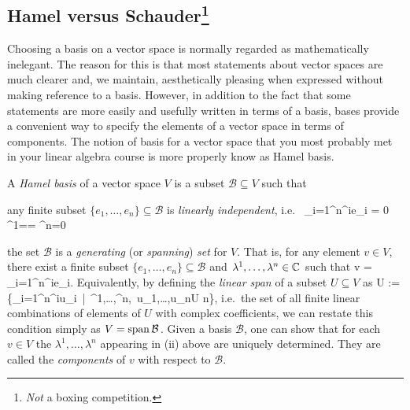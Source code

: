 \subsection[Hamel versus Schauder]{Hamel versus Schauder\protect\footnote{\emph{Not} a boxing competition.  }}

Choosing a basis on a vector space is normally regarded as mathematically inelegant. The reason for this is that most statements about vector spaces are much clearer and, we maintain, aesthetically pleasing when expressed without making reference to a basis. However, in addition to the fact that some statements are more easily and usefully written in terms of a basis, bases provide a convenient way to specify the elements of a vector space in terms of components.
The notion of basis for a vector space that you most probably met in your linear algebra course is more properly know as Hamel basis.

\bd
A \emph{Hamel basis} of a vector space $V$ is a subset $\mathcal{B}\subseteq V$ such that
\ben[label=(\roman*)]
\item any finite subset $\{e_1,\ldots,e_n\}\subseteq \mathcal{B}$ is \emph{linearly independent}, i.e.\
\bse
\sum_{i=1}^n\lambda^ie_i = 0 \quad \Rightarrow \quad \lambda^1=\cdots = \lambda^n=0
\ese
\item the set $\mathcal{B}$ is a \emph{generating} (or \emph{spanning}) \emph{set} for $V$. That is, for any element $v\in V$, there exist a finite subset $\{e_1,\ldots,e_n\}\subseteq \mathcal{B}$ and $\lambda^1,\ldots,\lambda^n\in\mathbb{C}$ such that
\bse
v = \sum_{i=1}^n\lambda^ie_i.
\ese
Equivalently, by defining the \emph{linear span} of a subset $U\subseteq V$ as
\bse
\lspan U := \biggl\{\sum_{i=1}^n\lambda^iu_i\ \Big|\ \lambda^1,\ldots,\lambda^n\in\C,\, u_1,\ldots,u_n\in U  n\biggr\},
\ese
i.e.\ the set of all finite linear combinations of elements of $U$ with complex coefficients, we can restate this condition simply as $V = \operatorname{span} \mathcal{B}$.
\een
\ed
Given a basis $\mathcal{B}$, one can show that for each $v\in V$ the $\lambda^1,\ldots,\lambda^n$ appearing in (ii) above are uniquely determined. They are called the \emph{components} of $v$ with respect to $\mathcal{B}$. 

